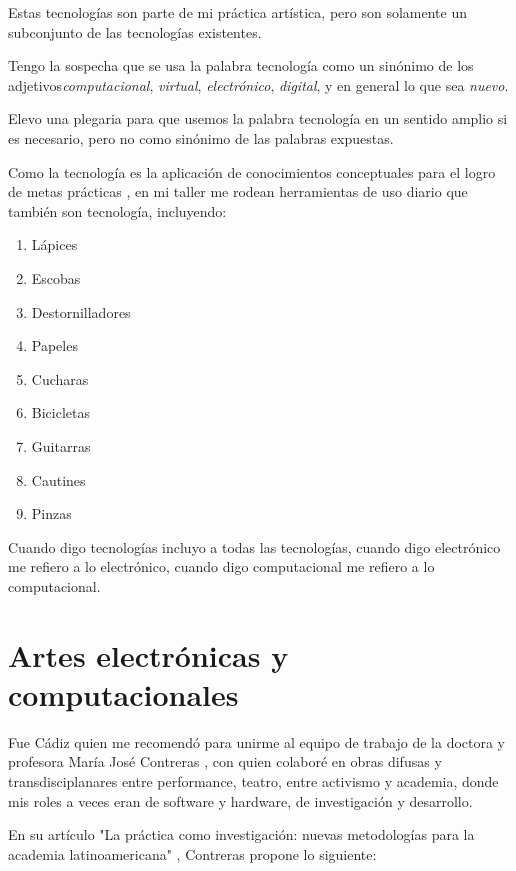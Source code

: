 \documentclass{article}
\begin{document}
Estas tecnologías son parte de mi práctica artística, pero son solamente un subconjunto de las tecnologías existentes.

Tengo la sospecha que se usa la palabra tecnología como un sinónimo de los adjetivos\textit{computacional}, \textit{virtual}, \textit{electrónico}, \textit{digital}, y en general lo que sea \textit{nuevo}.

Elevo una plegaria para que usemos la palabra tecnología en un sentido amplio si es necesario, pero no como sinónimo de las palabras expuestas.

Como la tecnología es la aplicación de conocimientos conceptuales para el logro de metas prácticas \cite{technology}, en mi taller me rodean herramientas de uso diario que también son tecnología, incluyendo:

\begin{enumerate}
    \item Lápices
    \item Escobas
    \item Destornilladores
    \item Papeles
    \item Cucharas
    \item Bicicletas
    \item Guitarras
    \item Cautines
    \item Pinzas
\end{enumerate}

Cuando digo tecnologías incluyo a todas las tecnologías, cuando digo electrónico me refiero a lo electrónico, cuando digo computacional me refiero a lo computacional.

\clearpage

\section{Artes electrónicas y computacionales}

Fue Cádiz quien me recomendó para unirme al equipo de trabajo de la doctora y profesora María José Contreras \cite{mariaJoseContreras}, con quien colaboré en obras difusas y transdisciplanares entre performance, teatro, entre activismo y academia, donde mis roles a veces eran de software y hardware, de investigación y desarrollo.

En su artículo "La práctica como investigación: nuevas metodologías para la academia latinoamericana" \cite{practicaComoInvestigacion}, Contreras propone lo siguiente:
\end{document}
